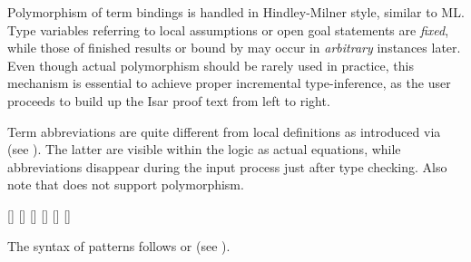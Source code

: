 \begin{isabellebody}
\begin{isamarkuptext}
  Polymorphism of term bindings is handled in Hindley-Milner style,
  similar to ML.  Type variables referring to local assumptions or
  open goal statements are \emph{fixed}, while those of finished
  results or bound by \hyperlink{command.let}{\mbox{}} may occur in \emph{arbitrary}
  instances later.  Even though actual polymorphism should be rarely
  used in practice, this mechanism is essential to achieve proper
  incremental type-inference, as the user proceeds to build up the
  Isar proof text from left to right.

  \medskip Term abbreviations are quite different from local
  definitions as introduced via \hyperlink{command.def}{\mbox{}} (see
  ).  The latter are visible within the
  logic as actual equations, while abbreviations disappear during the
  input process just after type checking.  Also note that \hyperlink{command.def}{\mbox{}} does not support polymorphism.

  \begin{railoutput}
[]
\rail@plus
\rail@plus
{}[]
[]
\rail@endplus
{}[]
[]
[]
\rail@endplus
\rail@end
\end{railoutput}


  The syntax of \hyperlink{keyword.is}{\mbox{}} patterns follows \hyperlink{syntax.term-pat}{\mbox{}} or
  \hyperlink{syntax.prop-pat}{\mbox{}} (see ).

  \begin{description}


\end{description}
\end{isamarkuptext}
\end{isabellebody}
